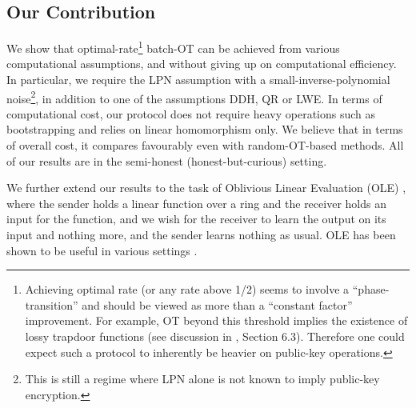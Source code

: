 \subsection{Our Contribution}

We show that optimal-rate\footnote{Achieving optimal rate (or any rate above 1/2) seems to involve a ``phase-transition'' and should be viewed as more than a ``constant factor'' improvement. For example, OT beyond this threshold implies the existence of lossy trapdoor functions (see discussion in \cite{C:DGIMMO19}, Section 6.3). Therefore one could expect such a protocol to inherently be heavier on public-key operations.} batch-OT can be achieved from various computational assumptions, and without giving up on computational efficiency. In particular, we require the LPN assumption with a small-inverse-polynomial noise\footnote{This is still a regime where LPN alone is not known to imply public-key encryption.}, in addition to one of the assumptions DDH, QR or LWE. In terms of computational cost, our protocol does not require heavy operations such as bootstrapping and relies on linear homomorphism only. We believe that in terms of overall cost, it compares favourably even with random-OT-based methods. 
All of our results are in the semi-honest (honest-but-curious) setting.



We further extend our results to the task of Oblivious Linear Evaluation (OLE) \cite{TCC:IshPraSah09,C:CDIKLOV19,AC:GhoNieNil17,PKC:BraDotMat22}, where the sender holds a linear function over a ring and the receiver holds an input for the function, and we wish for the receiver to learn the output on its input and nothing more, and the sender learns nothing as usual. OLE has been shown to be useful in various settings \cite{goldreich2019play,C:CDIKLOV19}.


